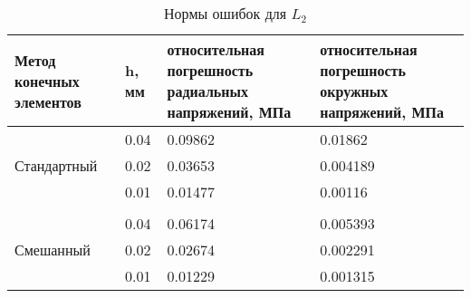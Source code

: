 \documentclass[a4paper,14pt]{extarticle}
\begin{document}
\begin{spacing}{1.0}	
\begin{table}[h]
\caption{Нормы ошибок для $L_{2}$}
\label{tabl:3CS}
\begin{center}
\begin{tabular}{|p{6em}|p{2.5em}|p{7em}|p{7em}|}
\hline
Метод \newline конечных элементов &h, мм & относительная погрешность радиальных напряжений, МПа &  относительная погрешность окружных напряжений, МПа \\
\hline
\multirow{3}{*}{Стандартный}
& 0.04  & 0.09862 & 0.01862 \\ \cline{2-4}
& 0.02  & 0.03653 & 0.004189 \\ \cline{2-4}
& 0.01 & 0.01477 & 0.00116 \\ \hline
\multicolumn{4}{|c|}{}\\
\hline
\multirow{3}{*}{Смешанный}
&0.04  & 0.06174 & 0.005393 \\ \cline{2-4}
&0.02  & 0.02674 & 0.002291 \\ \cline{2-4}
&0.01 & 0.01229 & 0.001315 \\ \hline
\end{tabular}
\end{center}
\end{table}

\begin{comment}
\begin{table}[h]
\caption{Отношение норм ошибок для $L_{2}$}
\label{tabl:3CSot}
\begin{center}
\begin{tabular}{|p{6em}|p{6.5em}|p{4em}|p{4em}|}
\hline
Метод  \newline конечных элементов & отношение \text{шагов по} пространству & отнош. погрешностей $\sigma_{rr}$ & отнош. погрешностей $\sigma_{\varphi\varphi}$ \\
\hline
\multirow{2}{*}{Стандартный}
&0.04/0.02=2 & 2.7 & 4.443 \\ \cline{2-4}
&0.04/0.01=4 & 6.677 & 16.04 \\ \hline												
\multicolumn{4}{|c|}{}\\ \hline
\multirow{2}{*}{Смешанный}
&0.04/0.02=2  & 2.309 & 2.353 \\ \cline{2-4}
&0.04/0.01=4 & 5.025 & 4.101 \\ \hline
\end{tabular}
\end{center}
\end{table}
\end{comment}


\end{spacing}
\end{document}
